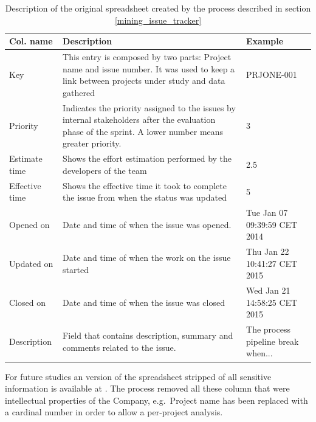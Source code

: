 \begin{table}[!htb]
			\centering
			\renewcommand{\arraystretch}{1.2}
			\tabulinesep=1.2mm
            \caption[Original spreadsheet description]{Description of the original spreadsheet created by the process described in section \ref{mining_issue_tracker}}
            \label{tab:spreadsheet_description}
            
			\begin{tabu} to \textwidth {|X|X[4]|X|}
			    
				\hline
				\textbf{Col. name} & \textbf{Description} & \textbf{Example} \\ \hline
				
				Key & This entry is composed by two parts: Project name and issue number. It was used to keep a link between projects under study and data gathered & PRJONE-001 \\ \hline
				
				Priority & Indicates the priority assigned to the issues by internal stakeholders after the evaluation phase of the sprint. A lower number means greater priority. & 3 \\ \hline
				
				Estimate time & Shows the effort estimation performed by the developers of the team & 2.5 \\ \hline
				
				Effective time & Shows the effective time it took to complete the issue from when the status was updated & 5 \\ \hline
				
				Opened on & Date and time of when the issue was opened. & Tue Jan 07 09:39:59 CET 2014 \\ \hline
				
				Updated on & Date and time of when the work on the issue started & Thu Jan 22 10:41:27 CET 2015  \\ \hline
				
				Closed on & Date and time of when the issue was closed & Wed Jan 21 14:58:25 CET 2015 \\ \hline
				
				Description & Field that contains description, summary and comments related to the issue. & The process pipeline break when... \\ \hline
				
			\end{tabu}		
		\end{table}


For future studies an version of the spreadsheet stripped of all sensitive information is available at . The process removed all these column that were intellectual properties of the Company, e.g.\ Project name has been replaced with a cardinal number in order to allow a per-project analysis.


